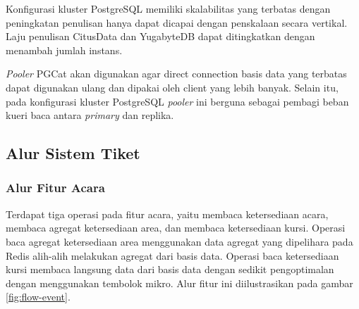 Konfigurasi kluster PostgreSQL memiliki skalabilitas yang terbatas dengan peningkatan penulisan hanya dapat dicapai dengan penskalaan secara vertikal. Laju penulisan CitusData dan YugabyteDB dapat ditingkatkan dengan menambah jumlah instans.

\textit{Pooler} PGCat akan digunakan agar direct connection basis data yang terbatas dapat digunakan ulang dan dipakai oleh client yang lebih banyak. Selain itu, pada konfigurasi kluster PostgreSQL \textit{pooler} ini berguna sebagai pembagi beban kueri baca antara \textit{primary} dan replika.

\subsection{Alur Sistem Tiket}

\subsubsection{Alur Fitur Acara}

Terdapat tiga operasi pada fitur acara, yaitu membaca ketersediaan acara, membaca agregat ketersediaan area, dan membaca ketersediaan kursi. Operasi baca agregat ketersediaan area menggunakan data agregat yang dipelihara pada Redis alih-alih melakukan agregat dari basis data. Operasi baca ketersediaan kursi membaca langsung data dari basis data dengan sedikit pengoptimalan dengan menggunakan tembolok mikro. Alur fitur ini diilustrasikan pada gambar \ref{fig:flow-event}.

\pagebreak

